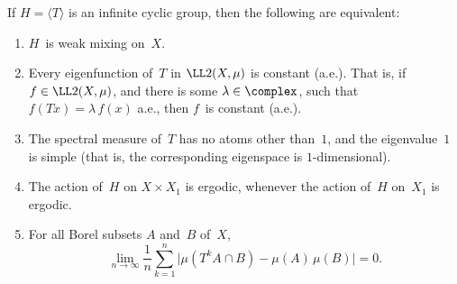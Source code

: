 \begin{thm} \label{WeakMixingZ}
If $H = \langle T \rangle$ is an infinite cyclic group, then the following are equivalent:
	\begin{enumerate}
	
	\item \label{WeakMixingZ-wm}
	$H$~is weak mixing on~$X$.

	\item \label{WeakMixingZ-eig}
	Every eigenfunction of~$T$ in $\LL2(X,\mu)$ is constant\/ \textup(a.e.\textup). That is, if $f \in \LL2(X,\mu)$, and there is some\/ $\lambda \in \complex$, such that $f(Tx) = \lambda \, f(x)$ a.e., then $f$~is constant\/ \textup(a.e.\textup).
			
	\item \label{WeakMixingZ-spectrum}
	The spectral measure of~$T$ has no atoms other than~$1$, and the eigenvalue~$1$ is simple\/ \textup(that is, the corresponding eigenspace is\/ $1$-dimensional\/\textup). 

	\item \label{WeakMixingZ-XxAny}
	The action of~$H$ on $X \times X_1$ is ergodic, whenever the action of~$H$ on~$X_1$ is ergodic.

		

	\item \label{WeakMixingZ-AbsVal}
For all Borel subsets $A$ and~$B$ of~$X$, 
		$$ \lim_{n \to \infty} \frac{1}{n} \sum_{k=1}^n 
			\bigl| \mu( T^k A \cap B) - \mu(A) \, \mu(B) \bigr| = 0 .$$


\end{enumerate}
\end{thm}

